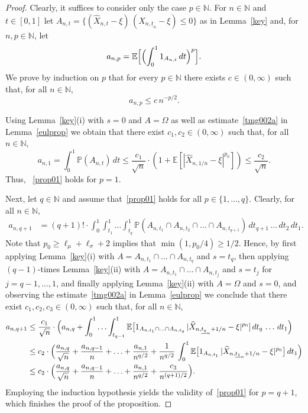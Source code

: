 \documentclass[11pt]{amsart}
\newcommand{\N}{{\mathbb N}}
\newcommand{\EE}{{\mathbb E}}
\newcommand{\PP}{{\mathbb P}}
\newcommand{\eul}{{\widehat X}}
\newcommand{\ind}{1}
\newcommand{\utn}{\underline {t}_n}
\theoremstyle{plain}
\theoremstyle{definition}
\begin{document}
\begin{proof}
Clearly, it suffices to consider only the case $p\in\N$.
For $n\in\N$ and $t\in [0,1]$
let $A_{n,t} =\{(\eul_{n,t}-\xi)\,(\eul_{n, \utn}-\xi)\leq 0\}$   as in Lemma~\ref{key} and, for $n,p\in\N$, let
\[
a_{n,p} = \EE\Bigl[\Bigl(\int_0^1 \ind_{A_{n,t}}\, dt\Bigr)^p\Bigr].
\]
 We prove by induction on $p$ that for every $p\in\N$ there exists $c\in (0,\infty)$ such that, for all $n\in\N$,
\begin{equation}\label{prop01}
a_{n,p} \le c\, n^{-p/2}.
\end{equation}


Using Lemma~\ref{key}(i) with $s=0$ and $A=\Omega$ as well as estimate~\eqref{tmg002a} in Lemma~\ref{eulprop} we
obtain that there exist $c_1,c_2\in (0,\infty)$ such that, for all $n\in\N$,
\[
a_{n,1} = \int_0^1 \PP(A_{n,t})\, dt  \le \frac{c_1}{\sqrt n}\cdot (1 + \EE[|\eul_{n,1/n}-\xi|^{p_0} ]) \le \frac{c_2}{\sqrt n}.
\]
Thus, ~\eqref{prop01} holds for $p=1$.

Next, let $q\in\N$
and assume that~\eqref{prop01} holds for all $p\in\{1, \ldots, q\}$.
Clearly,
for all $n\in\N$,
\begin{align*}
a_{n,q+1}  &= (q+1)!\cdot \int_0^1\int_{t_1}^1\ldots \int_{t_q}^1 \PP(A_{n,t_1}\cap A_{n,t_2}\cap \ldots \cap A_{n,t_{q+1}})\,dt_{q+1}\, \ldots \,dt_2\, dt_1.
\end{align*}
Note that $p_0\ge \ell_\mu + \ell_\sigma +2$ implies that $\min(1,p_0/4)\ge 1/2$. Hence, by
first applying Lemma~\ref{key}(i) with $A= A_{n,t_1}\cap \ldots \cap A_{n,t_q}$ and $s= t_{q}$, then applying $(q-1)$-times Lemma~\ref{key}(ii) with $A= A_{n,t_1}\cap \ldots \cap A_{n,t_j}$ and $s= t_j$ for $j=q-1,\ldots, 1$, and finally applying Lemma~\ref{key}(ii) with $A=\Omega$ and $s=0$, and observing the estimate~\eqref{tmg002a} in Lemma~\ref{eulprop} we conclude that there exist  $c_1, c_2, c_3\in(0, \infty)$ such that, for all $n\in\N$,
\begin{align*}
a_{n,q+1} & \le  \frac{c_1}{\sqrt n}\cdot \Bigl( a_{n,q}+\int_0^1\ldots \int_{t_{q-1}}^1 \EE\bigl[\ind_{A_{n,t_1}\cap \ldots \cap A_{n,t_q}}\, |\eul_{n,\underline{t_q}_n+1/n}-\xi|^{p_0} ]\,dt_q \, \ldots \, dt_1 \Bigr)\\
&  \le c_2\cdot \Bigl(\frac{a_{n,q}}{\sqrt n}  + \frac{a_{n,q-1}}{n}+\ldots + \frac{a_{n,1} }{n^{q/2}}+ \frac{1}{n^{q/2}}\,\int_0^1  \EE\bigl[\ind_{A_{n,t_1}}\, |\eul_{n,\underline{t_1}_n+1/n} - \xi|^{p_0} \bigr] \, dt_1\Bigr)\\
&  \le c_2\cdot\Bigl(\frac{a_{n,q}}{\sqrt n}  + \frac{a_{n,q-1}}{n}+\ldots + \frac{a_{n,1} }{n^{q/2}}+ \frac{c_3}{n^{(q+1)/2}} \Bigr).
\end{align*}
Employing  the induction hypothesis yields the validity of~\eqref{prop01} for $p=q+1$, which finishes the proof of the proposition.
\end{proof}
\end{document}
